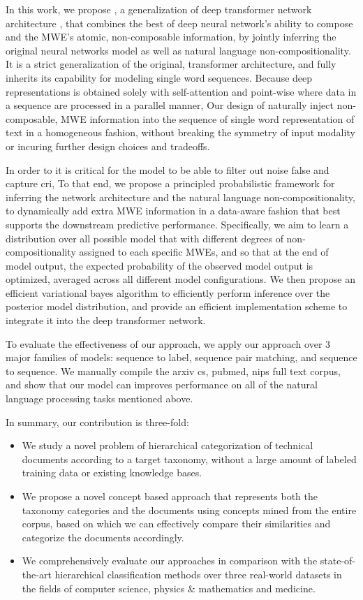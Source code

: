 In this work, 
we propose \BertMWE, a generalization of deep transformer network architecture \cite{vaswani2017attention}, 
that combines the best of deep neural network's ability to compose and the  MWE's atomic, non-composable information, 
by jointly inferring the original neural networks model as well as
natural language non-compositionality.
It is a strict generalization of the original, transformer architecture,
and fully inherits its capability for modeling single word sequences.  
Because deep representations is obtained solely with self-attention and point-wise where data in a sequence are processed in a parallel manner, Our design of \BertMWE naturally inject non-composable, MWE information into the sequence of single word representation of text in a homogeneous fashion, without breaking the symmetry of input modality or incuring further design choices and tradeoffs.


In order to 
it is critical for the model to be able to filter out noise false and capture cri, 
To that end, we propose a principled probabilistic framework for inferring the network architecture and the natural language non-compositionality, 
to dynamically add extra MWE information in a data-aware fashion
that best supports the downstream predictive performance. 
Specifically, we aim to learn a distribution over all possible model that with different degrees of non-compositionality assigned to each specific MWEs, and so that at the end of model output, the expected probability of the observed model output is optimized, averaged across all different model configurations.
We then propose an efficient variational bayes algorithm to efficiently perform inference over the posterior model distribution, and provide an efficient implementation scheme to integrate it into the deep transformer network. 


To evaluate the effectiveness of our approach, we apply our approach over 3 major families of models: sequence to label, sequence pair matching, and sequence to sequence. We manually compile the arxiv cs, pubmed, nips full text corpus, and show that our model can improves performance on all of the natural language processing tasks mentioned above.


In summary, our contribution is three-fold:
\begin{itemize}[leftmargin=*]
    \item We study a novel problem of hierarchical categorization of technical documents according to a target taxonomy, without a large amount of labeled training data or existing knowledge bases.
    \item 
    We propose a novel concept based approach that represents both the taxonomy categories and the documents using concepts mined from the entire corpus, based on which we can effectively compare their similarities and categorize the documents accordingly.
    \item We comprehensively evaluate our approaches in comparison with the state-of-the-art hierarchical classification methods over three real-world datasets in the fields of computer science, physics \& mathematics and medicine.
\end{itemize}

